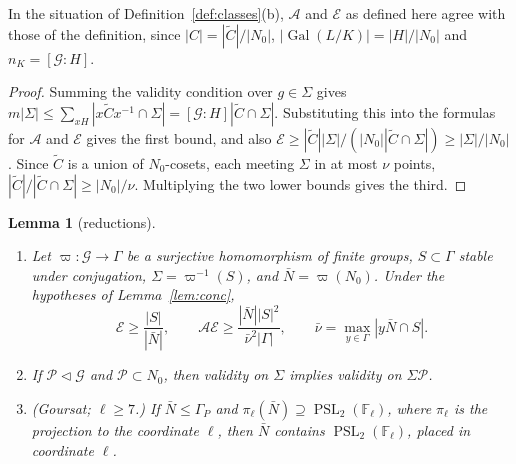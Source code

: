 \documentclass[11pt]{amsart}
\newtheorem{lemma}[theorem]{Lemma}
\theoremstyle{definition}
\theoremstyle{remark}
\newcommand{\F}{\mathbb{F}}
\DeclareMathOperator{\Gal}{Gal}
\DeclareMathOperator{\PSL}{PSL}
\newcommand{\cA}{\mathcal{A}}      %
\newcommand{\cE}{\mathcal{E}}      %
\newcommand{\cG}{\mathcal{G}}      %
\begin{document}
In the situation of Definition~\ref{def:classes}(b), $\cA$ and $\cE$ as defined here agree with those of the
definition, since $|C|=|\widetilde C|/|N_0|$, $|\Gal(L/K)|=|H|/|N_0|$ and $n_K=[\cG:H]$.

\begin{proof}
Summing the validity condition over $g\in\Sigma$ gives
$m|\Sigma|\le\sum_{xH}|x\widetilde Cx^{-1}\cap\Sigma|=[\cG:H]|\widetilde C\cap\Sigma|$. Substituting this into the
formulas for $\cA$ and $\cE$ gives the first bound, and also $\cE\ge|\widetilde C||\Sigma|/(|N_0||\widetilde C\cap
\Sigma|)\ge|\Sigma|/|N_0|$. Since $\widetilde C$ is a union of $N_0$-cosets, each meeting $\Sigma$ in at most $\nu$
points, $|\widetilde C|/|\widetilde C\cap\Sigma|\ge|N_0|/\nu$. Multiplying the two lower bounds gives the third.
\end{proof}

\begin{lemma}[reductions]\label{lem:red}
\begin{enumerate}[label=(\roman*)]
\item Let $\varpi:\cG\to\Gamma$ be a surjective homomorphism of finite groups, $S\subset\Gamma$ stable under
  conjugation, $\Sigma=\varpi^{-1}(S)$, and $\bar N=\varpi(N_0)$. Under the hypotheses of Lemma~\ref{lem:conc},
  \[
    \cE\ge\frac{|S|}{|\bar N|},\qquad \cA\cE\ge\frac{|\bar N||S|^2}{\bar\nu^2|\Gamma|},\qquad\bar\nu=\max_{y\in\Gamma}|y\bar N\cap S|.
  \]
\item If $\mathcal P\lhd\cG$ and $\mathcal P\subset N_0$, then validity on $\Sigma$ implies validity on $\Sigma\mathcal P$.
\item (Goursat; $\ell\ge7$.) If $\bar N\le\Gamma_P$ and $\pi_\ell(\bar N)\supseteq\PSL_2(\F_\ell)$, where $\pi_\ell$ is
  the projection to the coordinate $\ell$, then $\bar N$ contains $\PSL_2(\F_\ell)$, placed in coordinate $\ell$.
\end{enumerate}
\end{lemma}
\end{document}
